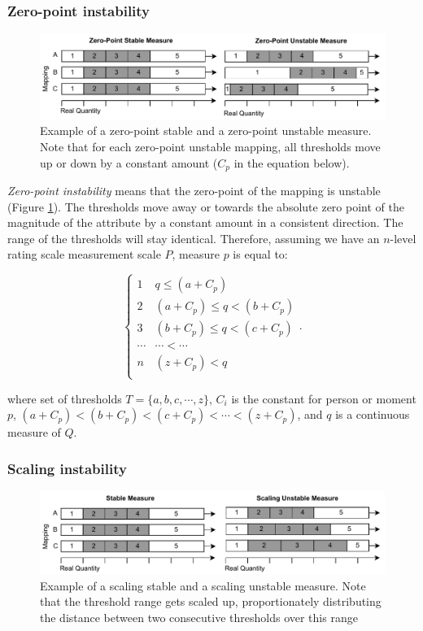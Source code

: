 \documentclass[titlepage, a4paper, 11pt]{article}
\begin{document}
\subsubsection{Zero-point instability}

\begin{figure}
  \centering
  \includegraphics[width=\columnwidth]{Plots/zeropointinstability.pdf}
  \caption{Example of a zero-point stable and a zero-point unstable measure. Note that for each zero-point unstable mapping, all thresholds move up or down by a constant amount ($C_p$ in the equation below).}
  \label{fig:diagram_one}
\end{figure}

\textit{Zero-point instability} means that the zero-point of the mapping is unstable (Figure \ref{fig:diagram_one}). The thresholds move away or towards the absolute zero point of the magnitude of the attribute by a constant amount in a consistent direction. The range of the thresholds will stay identical. Therefore, assuming we have an $n$-level rating scale measurement scale $P$, measure $p$ is equal to:

\[
\begin{cases} 
    1 & q \leq (a + C_{p})\\
    2 & (a + C_{p}) \leq q < (b + C_{p})\\
    3 & (b + C_{p}) \leq q < (c + C_{p})\\
    \cdots & \cdots < \cdots \\
    n & (z + C_{p}) < q\\
\end{cases}.
\]

where set of thresholds $T = \{a, b, c, \cdots, z\}$, $C_{i}$ is the constant for person or moment $p$, $(a + C_{p}) < (b + C_{p}) < (c + C_{p}) < \cdots < (z + C_{p})$, and $q$ is a continuous measure of $Q$. 

\subsubsection{Scaling instability}
\begin{figure}
  \centering
  \includegraphics[width=\columnwidth]{Plots/scalinginstability.pdf}
  \caption{Example of a scaling stable and a scaling unstable measure. Note that the threshold range gets scaled up, proportionately distributing the distance between two consecutive thresholds over this range}
  \label{fig:diagram_two}
\end{figure}
\end{document}
